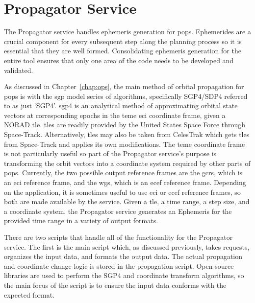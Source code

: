 
\section{Propagator Service}

The Propagator service handles ephemeris generation for \gls{pops}.
Ephemerides are a crucial component for every subsequent step along the
planning process so it is essential that they are well formed. Consolidating
ephemeris generation for the entire tool ensures that only one area of the code
needs to be developed and validated.

As discussed in Chapter~\ref{chap:ops}, the main method of orbital propagation
for \gls{pops} is with the \gls{sgp} model series of algorithms, specifically
SGP4/SDP4 referred to as just ‘SGP4’.  \gls{sgp4} is an analytical method of
approximating orbital state vectors at corresponding epochs in the \gls{teme}
\gls{eci} coordinate frame, given a NORAD \gls{tle}.  \gls{tle}s are readily
provided by the United States Space Force through Space-Track.  Alternatively,
\glspl{tle} may also be taken from CelesTrak which gets \glspl{tle} from
Space-Track and applies its own modifications.  The \gls{teme} coordinate frame
is not particularly useful so part of the Propagator service’s purpose is
transforming the orbit vectors into a coordinate system required by other parts
of \gls{pops}.  Currently, the two possible output reference frames are the
\gls{gcrs}, which is an \gls{eci} reference frame, and the \gls{wgs}, which is
an \gls{ecef} reference frame.  Depending on the application, it is sometimes
useful to use \gls{eci} or \gls{ecef} reference frames, so both are made
available by the service.  Given a \gls{tle}, a time range, a step size, and a
coordinate system, the Propagator service generates an Ephemeris for the
provided time range in a variety of output formats.

There are two scripts that handle all of the functionality for the Propagator
service. The first is the main script which, as discussed previously, takes
requests, organizes the input data, and formats the output data. The actual
propagation and coordinate change logic is stored in the propagation script.
Open source libraries are used to perform the SGP4 and coordinate transform
algorithms, so the main focus of the script is to ensure the input data
conforms with the expected format.  

